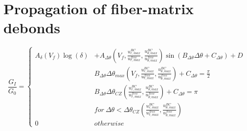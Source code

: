 \documentclass[review]{elsarticle}
\begin{document}
\section{Propagation of fiber-matrix debonds}

\begin{equation}
\frac{G_{I}}{G_{0}}=\begin{cases}
A_{\delta}\left(V_{f}\right)\log\left(\delta\right)&+A_{\Delta\theta}\left(V_{f},\frac{u^{BC}_{r,max}}{u^{free}_{r,max}},\frac{u^{BC}_{\theta,max}}{u^{free}_{\theta,max}}\right)\sin\left(B_{\Delta\theta}\Delta\theta+C_{\Delta\theta}\right)+D\\
&B_{\Delta\theta}\Delta\theta_{max}\left(V_{f},\frac{u^{BC}_{r,max}}{u^{free}_{r,max}},\frac{u^{BC}_{\theta,max}}{u^{free}_{\theta,max}}\right)+C_{\Delta\theta}=\frac{\pi}{2}\\
&B_{\Delta\theta}\Delta\theta_{CZ}\left(\frac{u^{BC}_{r,max}}{u^{free}_{r,max}},\frac{u^{BC}_{\theta,max}}{u^{free}_{\theta,max}}\right)+C_{\Delta\theta}=\pi\\
&for\ \Delta\theta<\Delta\theta_{CZ}\left(\frac{u^{BC}_{r,max}}{u^{free}_{r,max}},\frac{u^{BC}_{\theta,max}}{u^{free}_{\theta,max}}\right)\\
0&otherwise
\end{cases}
\end{equation}
\end{document}
